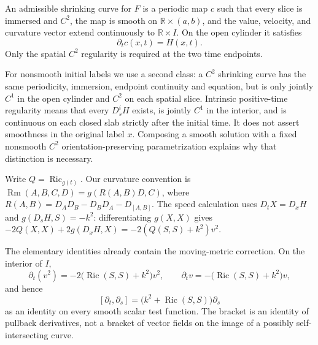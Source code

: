 \begin{definition}
\label{def:ramps-shrinking-curve}
An admissible shrinking curve for $F$ is a periodic map $c$ such that every
slice is immersed and $C^2$, the map is smooth on
$\mathbb R\times(a,b)$, and the value, velocity, and curvature vector extend
continuously to $\mathbb R\times I$.  On the open cylinder it satisfies
\[
  \partial_tc(x,t)=H(x,t).
\]
Only the spatial $C^2$ regularity is required at the two time endpoints.
\end{definition}

For nonsmooth initial labels we use a second class: a $C^2$ shrinking curve
has the same periodicity, immersion, endpoint continuity and equation, but
is only jointly $C^1$ in the open cylinder and $C^2$ on each spatial slice.
Intrinsic positive-time regularity means that every $D_s^iH$ exists, is
jointly $C^1$ in the interior, and is continuous on each closed slab strictly
after the initial time.  It does not assert smoothness in the original
label $x$.  Composing a smooth solution with a fixed nonsmooth $C^2$
orientation-preserving parametrization explains why that distinction is
necessary.

Write $Q=\operatorname{Ric}_{g(t)}$.  Our curvature convention is
$\operatorname{Rm}(A,B,C,D)=g(R(A,B)D,C)$, where
$R(A,B)=D_AD_B-D_BD_A-D_{[A,B]}$.
The speed calculation uses $D_tX=D_xH$ and
$g(D_sH,S)=-k^2$: differentiating $g(X,X)$ gives
$-2Q(X,X)+2g(D_xH,X)=-2(Q(S,S)+k^2)v^2$.

The elementary identities already contain the moving-metric correction.  On
the interior of $I$,
\begin{equation}\label{eq:ramps-speed}
 \partial_t(v^2)=-2\bigl(\operatorname{Ric}(S,S)+k^2\bigr)v^2,
 \qquad
 \partial_tv=-\bigl(\operatorname{Ric}(S,S)+k^2\bigr)v,
\end{equation}
and hence
\begin{equation}\label{eq:ramps-commutator}
 [\partial_t,\partial_s]
   =\bigl(k^2+\operatorname{Ric}(S,S)\bigr)\partial_s
\end{equation}
as an identity on every smooth scalar test function.  The bracket is an
identity of pullback derivatives, not a bracket of vector fields on the image
of a possibly self-intersecting curve.

